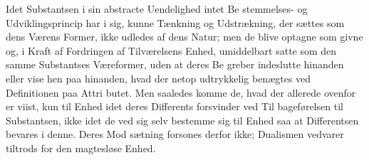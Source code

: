 \documentclass[12pt,a4paper]{book}
\begin{document}
Idet Substantsen i sin abstracte Uendelighed intet Be\-%
stemmelses- og Udviklingsprincip har i sig, kunne Tænkning
og Udstrækning, der sættes som dens Værens Former, ikke
udledes af dens Natur; men de blive optagne som givne og,
i Kraft af Fordringen af Tilværelsens Enhed, umiddelbart satte
som den samme Substantses Væreformer, uden at deres Be\-%
greber indeslutte hinanden eller vise hen paa hinanden, hvad
der netop udtrykkelig benægtes ved Definitionen paa Attri\-%
butet. Men saaledes komme de, hvad der allerede ovenfor er
viist, kun til Enhed idet deres Differents forsvinder ved Til\-%
bageførelsen til Substantsen, ikke idet de ved sig selv bestemme
sig til Enhed saa at Differentsen bevares i denne. Deres Mod\-%
sætning forsones derfor ikke; Dualismen vedvarer tiltrods for
den magtesløse Enhed.
\end{document}

